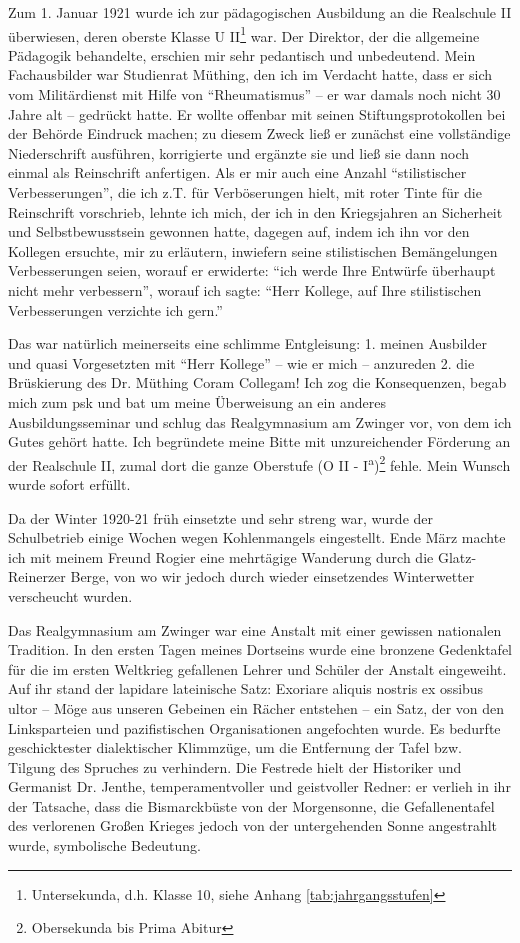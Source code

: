 \documentclass[a5paper,pagesize,10pt,twoside=true]{scrbook}
\begin{document}
Zum 1. Januar 1921 wurde ich zur pädagogischen Ausbildung an die Realschule II überwiesen, deren oberste Klasse U II\footnote{Untersekunda, d.h. Klasse 10, siehe Anhang \ref{tab:jahrgangsstufen}} war. Der Direktor, der die allgemeine Pädagogik behandelte, erschien mir sehr pedantisch und unbedeutend. Mein Fachausbilder war Studienrat Müthing, den ich im Verdacht hatte, dass er sich vom Militärdienst mit Hilfe von \enquote{Rheumatismus} -- er war damals noch nicht 30 Jahre alt -- gedrückt hatte. Er wollte offenbar mit seinen Stiftungsprotokollen bei der Behörde Eindruck machen; zu diesem Zweck ließ er zunächst eine vollständige Niederschrift ausführen, korrigierte und ergänzte sie und ließ sie dann noch einmal als Reinschrift anfertigen. Als er mir auch eine Anzahl \enquote{stilistischer Verbesserungen}, die ich z.T. für Verböserungen hielt, mit roter Tinte für die Reinschrift vorschrieb, lehnte ich mich, der ich in den Kriegsjahren an Sicherheit und Selbstbewusstsein gewonnen hatte, dagegen auf, indem ich ihn vor den Kollegen ersuchte, mir zu erläutern, inwiefern seine stilistischen Bemängelungen Verbesserungen seien, worauf er erwiderte: \enquote{ich werde Ihre Entwürfe überhaupt nicht mehr verbessern}, worauf ich sagte: \enquote{Herr Kollege, auf Ihre stilistischen Verbesserungen verzichte ich gern.}

Das war natürlich meinerseits eine schlimme Entgleisung: 1. meinen Ausbilder und quasi Vorgesetzten mit \enquote{Herr Kollege} -- wie er mich -- anzureden 2. die Brüskierung des Dr. Müthing Coram Collegam! Ich zog die Konsequenzen, begab mich zum \ac{psk} und bat um meine Überweisung an ein anderes Ausbildungsseminar und schlug das Realgymnasium am Zwinger vor, von dem ich Gutes gehört hatte. Ich begründete meine Bitte mit unzureichender Förderung an der Realschule II, zumal dort die ganze Oberstufe (O II - I\textsuperscript{a})\footnote{Obersekunda bis Prima Abitur} fehle. Mein Wunsch wurde sofort erfüllt.

Da der Winter 1920-21 früh einsetzte und sehr streng war, wurde der Schulbetrieb einige Wochen wegen Kohlenmangels eingestellt. Ende März machte ich mit meinem Freund Rogier eine mehrtägige Wanderung durch die Glatz-Reinerzer Berge, von wo wir jedoch durch wieder einsetzendes Winterwetter verscheucht wurden.

Das Realgymnasium am Zwinger war eine Anstalt mit einer gewissen nationalen Tradition. In den ersten Tagen meines Dortseins wurde eine bronzene Gedenktafel für die im ersten Weltkrieg gefallenen Lehrer und Schüler der Anstalt eingeweiht. Auf ihr stand der lapidare lateinische Satz: Exoriare aliquis nostris ex ossibus ultor -- Möge aus unseren Gebeinen ein Rächer entstehen -- ein Satz, der von den Linksparteien und pazifistischen Organisationen angefochten wurde. Es bedurfte geschicktester dialektischer Klimmzüge, um die Entfernung der Tafel bzw. Tilgung des Spruches zu verhindern. Die Festrede hielt der Historiker und Germanist Dr. Jenthe, temperamentvoller und geistvoller Redner: er verlieh in ihr der Tatsache, dass die Bismarckbüste von der Morgensonne, die Gefallenentafel des verlorenen Großen Krieges jedoch von der untergehenden Sonne angestrahlt wurde, symbolische Bedeutung.
\end{document}
